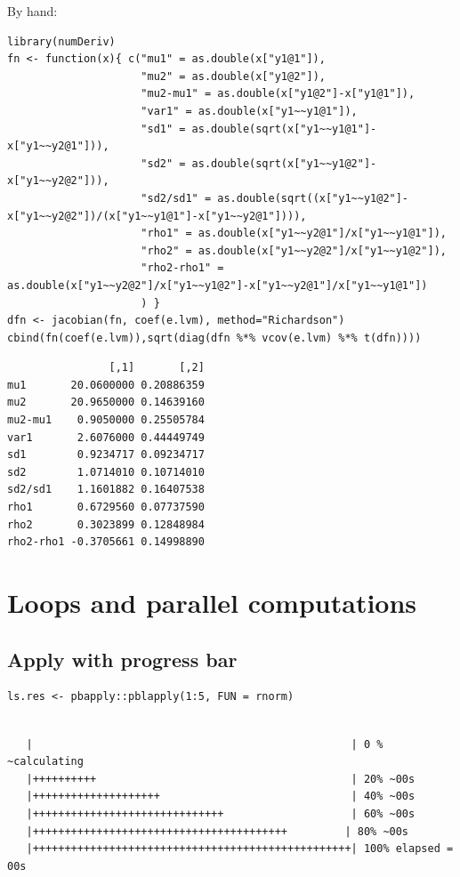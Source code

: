 \documentclass{article}
\begin{document}
By hand:
\lstset{language=r,label= ,caption= ,captionpos=b,numbers=none}
\begin{lstlisting}
library(numDeriv)
fn <- function(x){ c("mu1" = as.double(x["y1@1"]),
                     "mu2" = as.double(x["y1@2"]),
                     "mu2-mu1" = as.double(x["y1@2"]-x["y1@1"]),
                     "var1" = as.double(x["y1~~y1@1"]),
                     "sd1" = as.double(sqrt(x["y1~~y1@1"]-x["y1~~y2@1"])),
                     "sd2" = as.double(sqrt(x["y1~~y1@2"]-x["y1~~y2@2"])),
                     "sd2/sd1" = as.double(sqrt((x["y1~~y1@2"]-x["y1~~y2@2"])/(x["y1~~y1@1"]-x["y1~~y2@1"]))),
                     "rho1" = as.double(x["y1~~y2@1"]/x["y1~~y1@1"]),
                     "rho2" = as.double(x["y1~~y2@2"]/x["y1~~y1@2"]),
                     "rho2-rho1" = as.double(x["y1~~y2@2"]/x["y1~~y1@2"]-x["y1~~y2@1"]/x["y1~~y1@1"])
                     ) }
dfn <- jacobian(fn, coef(e.lvm), method="Richardson")
cbind(fn(coef(e.lvm)),sqrt(diag(dfn %*% vcov(e.lvm) %*% t(dfn))))
\end{lstlisting}

\begin{verbatim}
                [,1]       [,2]
mu1       20.0600000 0.20886359
mu2       20.9650000 0.14639160
mu2-mu1    0.9050000 0.25505784
var1       2.6076000 0.44449749
sd1        0.9234717 0.09234717
sd2        1.0714010 0.10714010
sd2/sd1    1.1601882 0.16407538
rho1       0.6729560 0.07737590
rho2       0.3023899 0.12848984
rho2-rho1 -0.3705661 0.14998890
\end{verbatim}

\section{Loops and parallel computations}
\label{sec:orge574283}
\subsection{Apply with progress bar}
\label{sec:org92ec9fa}

\lstset{language=r,label= ,caption= ,captionpos=b,numbers=none}
\begin{lstlisting}
ls.res <- pbapply::pblapply(1:5, FUN = rnorm)
\end{lstlisting}

\begin{verbatim}

   |                                                  | 0 % ~calculating  
   |++++++++++                                        | 20% ~00s          
   |++++++++++++++++++++                              | 40% ~00s          
   |++++++++++++++++++++++++++++++                    | 60% ~00s          
   |++++++++++++++++++++++++++++++++++++++++         | 80% ~00s          
   |++++++++++++++++++++++++++++++++++++++++++++++++++| 100% elapsed = 00s
\end{verbatim}
\end{document}
